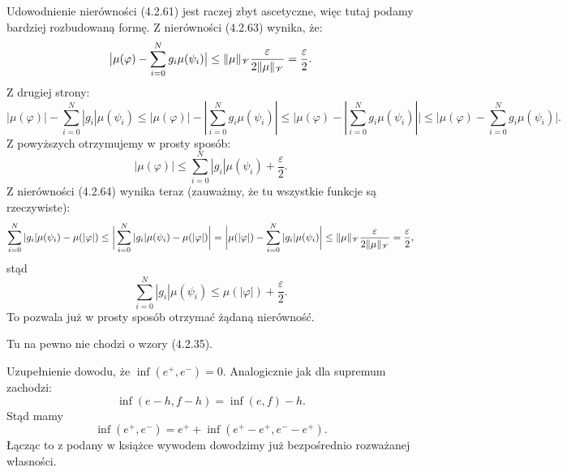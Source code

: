 \documentclass[a4paper,11pt]{article}
\begin{document}
\start {} Udowodnienie nierówności (4.2.61) jest raczej zbyt
ascetyczne, więc tutaj podamy bardziej rozbudowaną formę. Z
nierówności (4.2.63) wynika, że:
\begin{equation}
  \label{eq:SchwartzKAMVolI-04}
  \big| \mu( \varphi ) - \sum_{ i = 0 }^{ N } g_{ i } \mu( \psi_{ i } ) \big|
  \leq
  \Vert \mu \Vert_{ \mathcal{V} } \frac{ \varepsilon }{ 2 \Vert \mu \Vert_{ \mathcal{V} } } = \frac{ \varepsilon }{ 2 }.
\end{equation}
Z drugiej strony:
\begin{equation}
  \label{eq:SchwartzKAMVolI-05}
  | \mu( \varphi ) | - \sum_{ i = 0 }^{ N } | g_{ i } | \mu( \psi_{ i } )
  \leq
  | \mu( \varphi ) | - | \sum_{ i = 0 }^{ N } g_{ i } \mu( \psi_{ i } ) |
  \leq
  \bigg| \mu( \varphi ) - | \sum_{ i = 0 }^{ N }
  g_{ i } \mu( \psi_{ i } ) | \bigg| \leq \bigg| \mu( \varphi )
  - \sum_{ i = 0 }^{ N } g_{ i } \mu( \psi_{ i } ) \bigg|.
\end{equation}
Z powyższych otrzymujemy w prosty sposób:
\begin{equation}
  \label{eq:SchwartzKAMVolI-06}
  | \mu( \varphi ) |
  \leq
  \sum_{ i = 0 }^{ N } | g_{ i } | \mu( \psi_{ i } ) + \frac{ \varepsilon }{ 2 }.
\end{equation}
Z nierówności (4.2.64) wynika teraz (zauważmy, że tu wszystkie funkcje
są rzeczywiste):
\begin{equation}
  \label{eq:SchwartzKAMVolI-07}
  \sum_{ i = 0 }^{ N } | g_{ i } | \mu( \psi_{ i } ) - \mu( | \varphi | )
  \leq
  \bigg| \sum_{ i = 0 }^{ N } | g_{ i } | \mu( \psi_{ i } ) - \mu( | \varphi | ) \bigg|
  =
  \bigg| \mu( | \varphi | ) - \sum_{ i = 0 }^{ N } | g_{ i } | \mu( \psi_{ i } ) \bigg|
  \leq
  \Vert \mu \Vert_{ \mathcal{V} } \frac{ \varepsilon }{ 2 \Vert \mu \Vert_{ \mathcal{V} } } = \frac{ \varepsilon }{ 2 },
\end{equation}
stąd
\begin{equation}
  \label{eq:SchwartzKAMVolI-08}
  \sum_{ i = 0 }^{ N } | g_{ i } | \mu( \psi_{ i } )
  \leq
  \mu( | \varphi | ) + \frac{ \varepsilon }{ 2 }.
\end{equation}
To pozwala już w prosty sposób otrzymać żądaną nierówność.

\vspace{\spaceFour}


\start {} Tu na pewno nie chodzi o wzory (4.2.35).

\vspace{\spaceFour}


\start {} Uzupełnienie dowodu, że
$\inf( e^{ + }, e^{ - } ) = 0$. Analogicznie jak dla supremum
zachodzi:
\begin{equation}
  \label{eq:SchwartzKAMVolI-09}
  \inf( e - h, f - h ) = \inf( e, f ) - h.
\end{equation}
Stąd mamy
\begin{equation}
  \label{eq:SchwartzKAMVolI-10}
  \inf( e^{ + }, e^{ - } )
  =
  e^{ + } + \inf( e^{ + } - e^{ + }, e^{ - } - e^{ + } ).
\end{equation}
Łącząc to z podany w książce wywodem dowodzimy już bezpośrednio
rozważanej własności.
\end{document}
